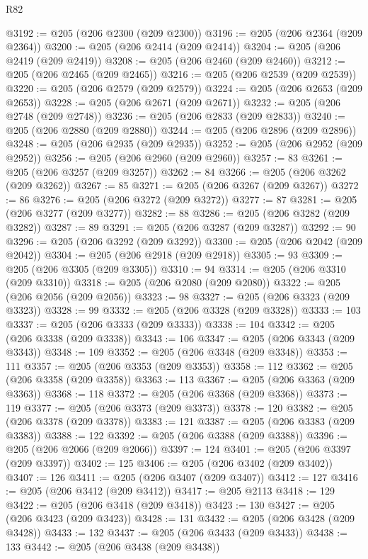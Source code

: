 \begin{lexlean}{R82}
\begin{coremodule}
@3192 := @205 (@206 @2300 (@209 @2300))
@3196 := @205 (@206 @2364 (@209 @2364))
@3200 := @205 (@206 @2414 (@209 @2414))
@3204 := @205 (@206 @2419 (@209 @2419))
@3208 := @205 (@206 @2460 (@209 @2460))
@3212 := @205 (@206 @2465 (@209 @2465))
@3216 := @205 (@206 @2539 (@209 @2539))
@3220 := @205 (@206 @2579 (@209 @2579))
@3224 := @205 (@206 @2653 (@209 @2653))
@3228 := @205 (@206 @2671 (@209 @2671))
@3232 := @205 (@206 @2748 (@209 @2748))
@3236 := @205 (@206 @2833 (@209 @2833))
@3240 := @205 (@206 @2880 (@209 @2880))
@3244 := @205 (@206 @2896 (@209 @2896))
@3248 := @205 (@206 @2935 (@209 @2935))
@3252 := @205 (@206 @2952 (@209 @2952))
@3256 := @205 (@206 @2960 (@209 @2960))
@3257 := 83
@3261 := @205 (@206 @3257 (@209 @3257))
@3262 := 84
@3266 := @205 (@206 @3262 (@209 @3262))
@3267 := 85
@3271 := @205 (@206 @3267 (@209 @3267))
@3272 := 86
@3276 := @205 (@206 @3272 (@209 @3272))
@3277 := 87
@3281 := @205 (@206 @3277 (@209 @3277))
@3282 := 88
@3286 := @205 (@206 @3282 (@209 @3282))
@3287 := 89
@3291 := @205 (@206 @3287 (@209 @3287))
@3292 := 90
@3296 := @205 (@206 @3292 (@209 @3292))
@3300 := @205 (@206 @2042 (@209 @2042))
@3304 := @205 (@206 @2918 (@209 @2918))
@3305 := 93
@3309 := @205 (@206 @3305 (@209 @3305))
@3310 := 94
@3314 := @205 (@206 @3310 (@209 @3310))
@3318 := @205 (@206 @2080 (@209 @2080))
@3322 := @205 (@206 @2056 (@209 @2056))
@3323 := 98
@3327 := @205 (@206 @3323 (@209 @3323))
@3328 := 99
@3332 := @205 (@206 @3328 (@209 @3328))
@3333 := 103
@3337 := @205 (@206 @3333 (@209 @3333))
@3338 := 104
@3342 := @205 (@206 @3338 (@209 @3338))
@3343 := 106
@3347 := @205 (@206 @3343 (@209 @3343))
@3348 := 109
@3352 := @205 (@206 @3348 (@209 @3348))
@3353 := 111
@3357 := @205 (@206 @3353 (@209 @3353))
@3358 := 112
@3362 := @205 (@206 @3358 (@209 @3358))
@3363 := 113
@3367 := @205 (@206 @3363 (@209 @3363))
@3368 := 118
@3372 := @205 (@206 @3368 (@209 @3368))
@3373 := 119
@3377 := @205 (@206 @3373 (@209 @3373))
@3378 := 120
@3382 := @205 (@206 @3378 (@209 @3378))
@3383 := 121
@3387 := @205 (@206 @3383 (@209 @3383))
@3388 := 122
@3392 := @205 (@206 @3388 (@209 @3388))
@3396 := @205 (@206 @2066 (@209 @2066))
@3397 := 124
@3401 := @205 (@206 @3397 (@209 @3397))
@3402 := 125
@3406 := @205 (@206 @3402 (@209 @3402))
@3407 := 126
@3411 := @205 (@206 @3407 (@209 @3407))
@3412 := 127
@3416 := @205 (@206 @3412 (@209 @3412))
@3417 := @205 @2113
@3418 := 129
@3422 := @205 (@206 @3418 (@209 @3418))
@3423 := 130
@3427 := @205 (@206 @3423 (@209 @3423))
@3428 := 131
@3432 := @205 (@206 @3428 (@209 @3428))
@3433 := 132
@3437 := @205 (@206 @3433 (@209 @3433))
@3438 := 133
@3442 := @205 (@206 @3438 (@209 @3438))

\end{coremodule}
\end{lexlean}
